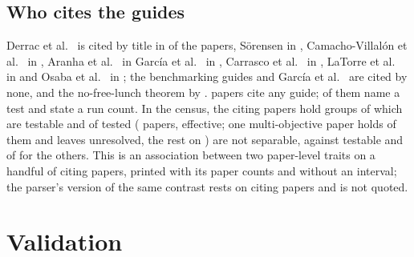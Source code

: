 \documentclass[preprint,review,12pt]{elsarticle}
\begin{document}
\subsection{Who cites the guides}
\label{sec:cites}

Derrac et al.\ \cite{derrac2011practical} is cited by title in \nCcDerrac{} of the \nSkAllPapers{} papers, Sörensen \cite{sorensen2015metaheuristics} in \nCcSorensen{}, Camacho-Villalón et al.\ \cite{camacho2022exposing} in \nCcCamacho{}, Aranha et al.\ \cite{aranha2022metaphor} in \nCcAranha{} García et al.\ \cite{garcia2010advanced} in \nCcGarciaTen{}, Carrasco et al.\ \cite{carrasco2020recent} in \nCcCarrasco{}, LaTorre et al.\ \cite{latorre2021prescription} in \nCcLatorre{} and Osaba et al.\ \cite{osaba2021tutorial} in \nCcOsaba{}; the benchmarking guides \cite{bartz2020benchmarking,beiranvand2017best,kendall2016good,hansen2021coco} and García et al.\ \cite{garcia2009study} are cited by none, and the no-free-lunch theorem \cite{wolpert1997no} by \nCcNfl{}. \nSkAllCitesMethodology{} papers cite any guide; \nCcCitingNameATest{} of them name a test and \nCcCitingStateRuns{} state a run count. In the census, the \nCrcCiteCitingPapers{} citing papers hold \nCrcCiteCitingGroups{} groups of which \nCrcCiteCitingTestable{} are testable and \nCrcCiteCitingFail{} of \nCrcCiteCitingTested{} tested (\nCrcCiteCitingTestedPapers{} papers, \nCrcCiteCitingTestedEffective{} effective; one multi-objective paper holds \nCrcCiteCitingLargestTested{} of them and leaves \nCrcCiteCitingLargestFail{} unresolved, the rest \nCrcCiteCitingWithoutLargestFail{} on \nCrcCiteCitingWithoutLargestTested{}) are not separable, against \nCrcCiteNotCitingTestable{} testable and \nCrcCiteNotCitingFail{} \nCrcCiteNotCitingFailCi{} of \nCrcCiteNotCitingTested{} for the \nCrcCiteNotCitingPapers{} others. This is an association between two paper-level traits on a handful of citing papers, printed with its paper counts and without an interval; the parser's version of the same contrast rests on \nCcCitingTestablePapers{} citing papers and is not quoted.

\section{Validation}
\label{sec:validation}
\end{document}
